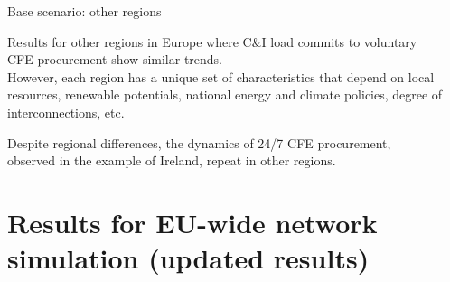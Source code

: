 \begin{frame}{Base scenario: other regions}
  \centering
  
  Results for other regions in Europe where C\&I load commits to voluntary  \\ 
  CFE procurement 
  show \alert{similar trends.} \\ 
  
  \vspace{0.3cm}
  However, each region has a \alert{unique set of characteristics} 
  that depend on local resources, renewable potentials,
  national energy and climate policies, degree of interconnections, etc.

  \vspace{0.3cm}
  Despite regional differences, the dynamics of 24/7 CFE procurement, \\
  observed in the example of Ireland, repeat in other regions.

\end{frame}




\section{Results for EU-wide network simulation (updated results)}


